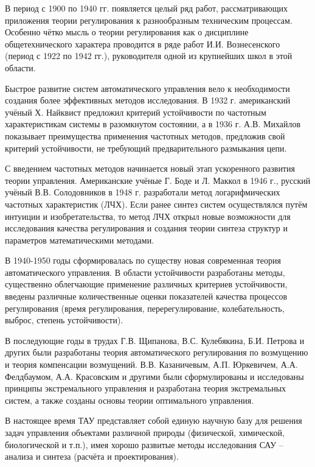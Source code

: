 \documentclass[14pt,a4paper,report]{report}
\begin{document}
В период с 1900 по 1940 гг. появляется целый ряд работ, рассматривающих приложения теории регулирования к разнообразным техническим процессам. Особенно чётко мысль о теории регулирования как о дисциплине общетехнического характера проводится в ряде работ И.И. Вознесенского (период с 1922 по 1942 гг.), руководителя одной из крупнейших школ в этой области.

Быстрое развитие систем автоматического управления вело к необходимости создания более эффективных методов исследования. В 1932 г. американский учёный Х. Найквист предложил критерий устойчивости по частотным характеристикам системы в разомкнутом состоянии, а в 1936 г. А.В. Михайлов показывает преимущества применения частотных методов, предложив свой критерий устойчивости, не требующий предварительного размыкания цепи.

С введением частотных методов начинается новый этап ускоренного развития теории управления. Американские учёные Г. Боде и Л. Маккол в 1946 г., русский учёный В.В. Солодовников в 1948 г. разработали метод логарифмических частотных характеристик (ЛЧХ). Если ранее синтез систем осуществлялся путём интуиции и изобретательства, то метод ЛЧХ открыл новые возможности для исследования качества регулирования и создания теории синтеза структур и параметров математическими методами.

В 1940-1950 годы сформировалась по существу новая современная теория автоматического управления. В области устойчивости разработаны методы, существенно облегчающие применение различных критериев устойчивости, введены различные количественные оценки показателей качества процессов регулирования (время регулирования, перерегулирование, колебательность, выброс, степень устойчивости).

В последующие годы в трудах Г.В. Щипанова, В.С. Кулебякина, Б.И. Петрова и других были разработаны теория автоматического регулирования по возмущению и теория компенсации возмущений. В.В. Казаничевым, А.П. Юркевичем, А.А. Фелдбаумом, А.А. Красовским и другими были сформулированы и исследованы принципы экстремального управления и разработана теория экстремальных систем, а также созданы основы теории оптимального управления.

В настоящее время ТАУ представляет собой единую научную базу для решения задач управления объектами различной природы (физической, химической, биологической и т.п.), имея хорошо развитые методы исследования САУ – анализа и синтеза (расчёта и проектирования).
\end{document}
